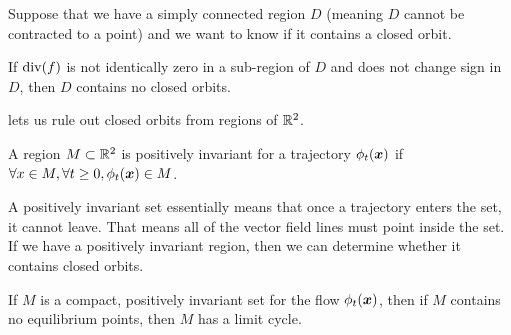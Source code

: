 Suppose that we have a simply connected region $D$ (meaning $D$ cannot be
contracted to a point) and we want to know if it contains a closed orbit.
\begin{theorem}
	If $\operatorname*{div}(f)$ is not identically zero in a sub-region of $D$ and does not
	change sign in $D$, then $D$ contains no closed orbits.
	\label{thm:bendixons}
\end{theorem}
 lets us rule out closed orbits from regions of
$\mathbb{R}^2$.
\begin{definition}
	A region $M \subset \mathbb{R}^2$ is positively invariant for a trajectory
	$\phi_t(\boldsymbol{x})$ if $\forall x\in M, \forall t \geq 0, \phi_t(\boldsymbol{x}) \in M$.
	\label{defn:positive-invariance}
\end{definition}
A positively invariant set essentially means that once a trajectory enters the
set, it cannot leave. That means all of the vector field lines must point inside
the set.
If we have a positively invariant region, then we can determine whether it
contains closed orbits.
\begin{theorem}
	If $M$ is a compact, positively invariant set for the flow $\phi_t(\boldsymbol{x})$,
	then if $M$ contains no equilibrium points, then $M$ has a limit cycle.
	\label{thm:poincare-bendixson}
\end{theorem}
